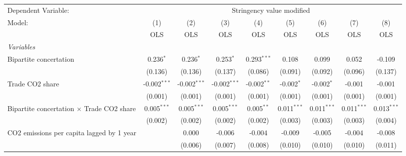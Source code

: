 
\begingroup
\centering
\begin{tabular}{lcccccccc}
   \toprule
   Dependent Variable: & \multicolumn{8}{c}{Stringency value modified}\\
   Model:                                                     & (1)            & (2)            & (3)            & (4)           & (5)           & (6)           & (7)           & (8)\\  
                                                              &  OLS           & OLS            & OLS            & OLS           & OLS           & OLS           & OLS           & OLS\\  
   \midrule
   \emph{Variables}\\
   Bipartite concertation                                     & 0.236$^{*}$    & 0.236$^{*}$    & 0.253$^{*}$    & 0.293$^{***}$ & 0.108         & 0.099         & 0.052         & -0.109\\   
                                                              & (0.136)        & (0.136)        & (0.137)        & (0.086)       & (0.091)       & (0.092)       & (0.096)       & (0.137)\\   
   Trade CO2 share                                            & -0.002$^{***}$ & -0.002$^{***}$ & -0.002$^{***}$ & -0.002$^{**}$ & -0.002$^{*}$  & -0.002$^{*}$  & -0.001        & -0.001\\   
                                                              & (0.001)        & (0.001)        & (0.001)        & (0.001)       & (0.001)       & (0.001)       & (0.001)       & (0.001)\\   
   Bipartite concertation $\times$ Trade CO2 share            & 0.005$^{***}$  & 0.005$^{***}$  & 0.005$^{***}$  & 0.005$^{**}$  & 0.011$^{***}$ & 0.011$^{***}$ & 0.011$^{***}$ & 0.013$^{***}$\\   
                                                              & (0.002)        & (0.002)        & (0.002)        & (0.002)       & (0.003)       & (0.003)       & (0.003)       & (0.004)\\   
   CO2 emissions per capita lagged by 1 year                  &                & 0.000          & -0.006         & -0.004        & -0.009        & -0.005        & -0.004        & -0.008\\   
                                                              &                & (0.006)        & (0.007)        & (0.008)       & (0.010)       & (0.010)       & (0.010)       & (0.011)\\   

\end{tabular}
